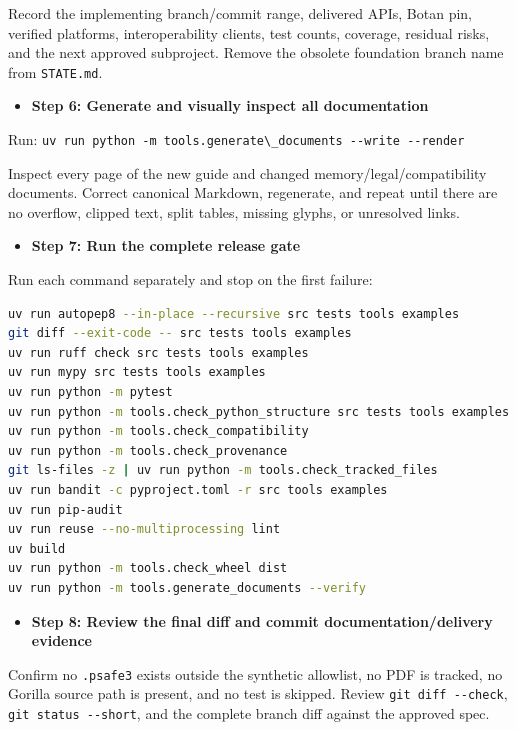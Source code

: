 \documentclass[
  letterpaper,
]{article}
\newcommand{\passthrough}[1]{#1}
\providecommand{\tightlist}{%
  \setlength{\itemsep}{0pt}\setlength{\parskip}{0pt}}
\begin{document}
Record the implementing branch/commit range, delivered APIs, Botan pin, verified platforms, interoperability clients,
test counts, coverage, residual risks, and the next approved subproject. Remove the obsolete foundation branch name from
\passthrough{\lstinline!STATE.md!}.

\begin{itemize}
\tightlist
\item[$\square$]
  \textbf{Step 6: Generate and visually inspect all documentation}
\end{itemize}

Run: \passthrough{\lstinline!uv run python -m tools.generate\_documents --write --render!}

Inspect every page of the new guide and changed memory/legal/compatibility documents. Correct canonical Markdown,
regenerate, and repeat until there are no overflow, clipped text, split tables, missing glyphs, or unresolved links.

\begin{itemize}
\tightlist
\item[$\square$]
  \textbf{Step 7: Run the complete release gate}
\end{itemize}

Run each command separately and stop on the first failure:

\begin{lstlisting}[language=bash]
uv run autopep8 --in-place --recursive src tests tools examples
git diff --exit-code -- src tests tools examples
uv run ruff check src tests tools examples
uv run mypy src tests tools examples
uv run python -m pytest
uv run python -m tools.check_python_structure src tests tools examples
uv run python -m tools.check_compatibility
uv run python -m tools.check_provenance
git ls-files -z | uv run python -m tools.check_tracked_files
uv run bandit -c pyproject.toml -r src tools examples
uv run pip-audit
uv run reuse --no-multiprocessing lint
uv build
uv run python -m tools.check_wheel dist
uv run python -m tools.generate_documents --verify
\end{lstlisting}

\begin{itemize}
\tightlist
\item[$\square$]
  \textbf{Step 8: Review the final diff and commit documentation/delivery evidence}
\end{itemize}

Confirm no \passthrough{\lstinline!.psafe3!} exists outside the synthetic allowlist, no PDF is tracked, no Gorilla
source path is present, and no test is skipped. Review \passthrough{\lstinline!git diff --check!},
\passthrough{\lstinline!git status --short!}, and the complete branch diff against the approved spec.
\end{document}
